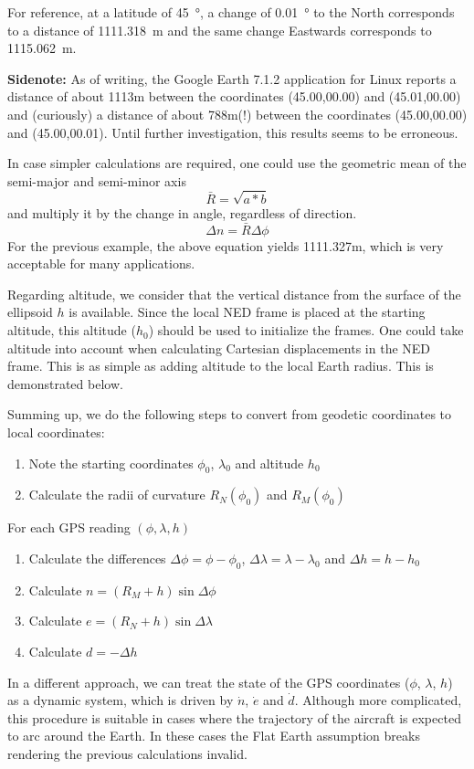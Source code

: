 For reference, at a latitude of \SI{45}{\degree}, a change of \SI{0.01}{\degree} to the North corresponds to a distance of \SI{1111.318}{\m} and the same change Eastwards corresponds to \SI{1115.062}{\m}.

\textbf{Sidenote:} As of writing, the Google Earth 7.1.2 application for Linux reports a distance of about 1113m between the coordinates (45.00,00.00) and (45.01,00.00) and (curiously) a distance of about 788m(!) between the coordinates (45.00,00.00) and (45.00,00.01). Until further investigation, this results seems to be erroneous.

In case simpler calculations are required, one could use the geometric mean of the semi-major and semi-minor axis
\begin{equation}
	\bar{R} = \sqrt{a*b}
\end{equation}
and multiply it by the change in angle, regardless of direction.
\begin{equation}
	\Delta n = \bar{R} \Delta \phi
\end{equation}
For the previous example, the above equation yields 1111.327m, which is very acceptable for many applications.


Regarding altitude, we consider that the vertical distance from the surface of the ellipsoid $h$ is available. Since the local NED frame is placed at the starting altitude, this altitude ($h_0$) should be used to initialize the frames. One could take altitude into account when calculating Cartesian displacements in the NED frame. This is as simple as adding altitude to the local Earth radius. This is demonstrated below.

Summing up, we do the following steps to convert from geodetic coordinates to local coordinates:
\begin{enumerate}
	\item Note the starting coordinates $\phi_0$, $\lambda_0$ and altitude $h_0$
	\item Calculate the radii of curvature $R_N(\phi_0)$ and $R_M(\phi_0)$
\end{enumerate}
For each GPS reading $(\phi, \lambda, h)$
\begin{enumerate}
	\item Calculate the differences $\Delta \phi = \phi - \phi_0$, $\Delta \lambda = \lambda - \lambda_0$ and $\Delta h = h - h_0$
	\item Calculate $n = (R_M + h) \sin \Delta \phi$
	\item Calculate $e = (R_N + h) \sin \Delta \lambda$
	\item Calculate $d = -\Delta h$
\end{enumerate}

In a different approach, we can treat the state of the GPS coordinates ($\phi$, $\lambda$, $h$) as a dynamic system, which is driven by $\dot{n}$, $\dot{e}$ and $\dot{d}$. Although more complicated, this procedure is suitable in cases where the trajectory of the aircraft is expected to arc around the Earth. In these cases the Flat Earth assumption breaks rendering the previous calculations invalid.

